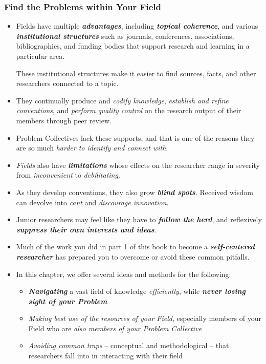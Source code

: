 \documentclass[11pt]{article}
\begin{document}
\subsubsection{Find the Problems within Your Field}
\begin{itemize}
\item Fields have multiple \emph{\textbf{advantages}}, including \emph{\textbf{topical coherence}}, and various \emph{\textbf{institutional structures}} such as journals, conferences, associations, bibliographies, and funding bodies that support research and learning in a particular area. 

These institutional structures make it easier to find sources, facts, and other researchers connected to a topic.

\item They continually produce and \emph{codify knowledge}, \emph{establish and refine conventions}, and \emph{perform quality control} on the research output of their members through peer review. 

\item Problem Collectives lack these supports, and that is one of the reasons they are so much \emph{harder to identify and connect with}.

\item \emph{Fields} also have \emph{\textbf{limitations}} whose effects on the researcher range in severity from \emph{inconvenient} to \emph{debilitating}.

\item As they develop conventions, they also grow \emph{\textbf{blind spots}}. Received wisdom can devolve into \emph{cant} and \emph{discourage innovation}.

\item Junior researchers may feel like they have to \emph{\textbf{follow the herd}}, and reflexively \emph{\textbf{suppress their own interests and ideas}}.

\item Much of the work you did in part 1 of this book to become a \emph{\textbf{self-centered researcher}} has prepared you to overcome or avoid these common pitfalls. 

\item In this chapter, we offer several ideas and methods for the following:
\begin{itemize}
\item \emph{\textbf{Navigating}} a vast field of knowledge \emph{efficiently}, while \emph{\textbf{never losing sight of your Problem}}
\item \emph{Making best use of the resources of your Field}, especially members of your Field who are \emph{also members of your Problem Collective}
\item \emph{Avoiding common traps} -- conceptual and methodological -- that researchers fall into in interacting with their field
\end{itemize}


\end{itemize}
\end{document}
